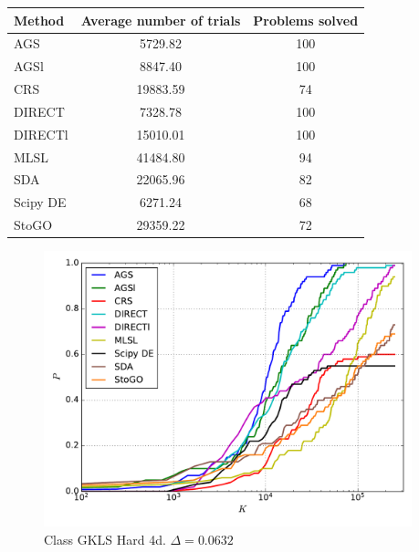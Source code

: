 \documentclass[a4paper]{article}
\begin{document}
\begin{tabular}{lcc}
\hline
 Method   &  Average number of trials  &  Problems solved  \\
\hline
 AGS      &          5729.82           &        100        \\
 AGSl     &          8847.40           &        100        \\
 CRS      &          19883.59          &        74         \\
 DIRECT   &          7328.78           &        100        \\
 DIRECTl  &          15010.01          &        100        \\
 MLSL     &          41484.80          &        94         \\
 SDA      &          22065.96          &        82         \\
 Scipy DE &          6271.24           &        68         \\
 StoGO    &          29359.22          &        72         \\
\hline
\end{tabular}
\begin{figure}[H]
  \center
  \includegraphics[width=0.95\textwidth]{../experiments/gklsh4d_serg/cmc.pdf}
  \caption{Class GKLS Hard 4d. $\Delta=0.0632$}

\end{figure}
\end{document}
